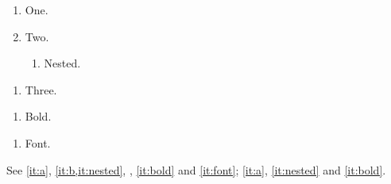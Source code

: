 \documentclass{article}
\begin{document}
\begin{enumerate}[label=(\alph*)]
\item One.\label{it:a}
\item Two.\label{it:b}
\begin{enumerate}[label*=.\arabic*]
\item Nested.\label{it:nested}
\end{enumerate}
\end{enumerate}
\begin{enumerate}[label=\roman*., ref=\roman*, start=3]
\item Three.\label{it:roman}
\end{enumerate}
\begin{enumerate}[label=\textbf{\arabic*.}, leftmargin=*]
\item Bold.\label{it:bold}
\end{enumerate}
\begin{enumerate}[font=\bfseries]
\item Font.\label{it:font}
\end{enumerate}
See \cref{it:a}, \cref{it:b,it:nested}, , \cref{it:bold} and \cref{it:font}; \ref{it:a}, \ref{it:nested} and \ref{it:bold}.
\end{document}
